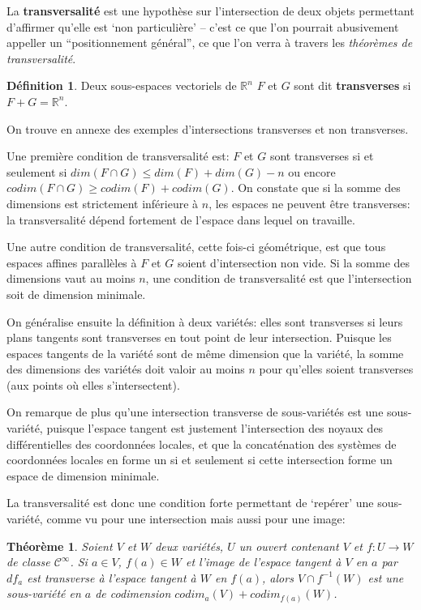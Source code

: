 \documentclass{article}
\newcommand{\cinf}{\mathcal{C}^\infty}
\newcommand{\R}{\mathbb{R}}
\newtheorem{thm}{Théorème}
\theoremstyle{definition}
\newtheorem{defn}{Définition}
\begin{document}
La \textbf{transversalité} est une hypothèse sur l'intersection de deux objets permettant d'affirmer qu'elle est `non particulière' -- c'est ce que l'on pourrait abusivement appeller un ``positionnement général'', ce que l'on verra à travers les \textit{théorèmes de transversalité}.
\begin{defn}
	Deux sous-espaces vectoriels de $\R^n$ $F$ et $G$ sont dit \textbf{transverses} si $F+G=\R^n$.
\end{defn}

On trouve en annexe des exemples d'intersections transverses et non transverses.

Une première condition de transversalité est: $F$ et $G$ sont transverses si et seulement si $dim(F\cap G)\leq dim(F)+dim(G)-n$ ou encore $codim(F\cap G)\geq codim(F)+codim(G)$.
On constate que si la somme des dimensions est strictement inférieure à $n$, les espaces ne peuvent être transverses: la transversalité dépend fortement de l'espace dans lequel on travaille.

Une autre condition de transversalité, cette fois-ci géométrique, est que tous espaces affines parallèles à $F$ et $G$ soient d'intersection non vide.
Si la somme des dimensions vaut au moins $n$, une condition de transversalité est que l'intersection soit de dimension minimale.

On généralise ensuite la définition à deux variétés: elles sont transverses si leurs plans tangents sont transverses en tout point de leur intersection.
Puisque les espaces tangents de la variété sont de même dimension que la variété, la somme des dimensions des variétés doit valoir au moins $n$ pour qu'elles soient transverses (aux points où elles s'intersectent).

On remarque de plus qu'une intersection transverse de sous-variétés est une sous-variété, puisque l'espace tangent est justement l'intersection des noyaux des différentielles des coordonnées locales, et que la concaténation des systèmes de coordonnées locales en forme un si et seulement si cette intersection forme un espace de dimension minimale.

La transversalité est donc une condition forte permettant de `repérer' une sous-variété, comme vu pour une intersection mais aussi pour une image:
\begin{thm}
	Soient $V$ et $W$ deux variétés, $U$ un ouvert contenant $V$ et $f:U\to W$ de classe $\cinf$.
	Si $a\in V$, $f(a)\in W$ et l'image de l'espace tangent à $V$ en $a$ par $df_a$ est transverse à l'espace tangent à $W$ en $f(a)$, alors $V\cap f^{-1}(W)$ est une sous-variété en $a$ de codimension $codim_a(V) + codim_{f(a)}(W)$.
\end{thm}
\end{document}
